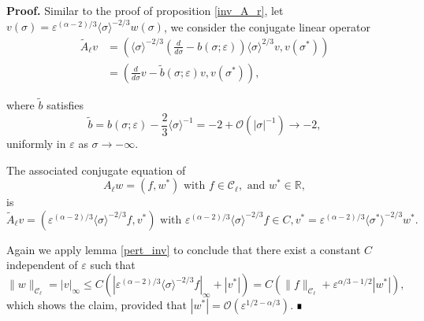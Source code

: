\documentclass[letterpaper,11pt]{article}
\newcommand{\rmO}{\mathcal{O}}
\newcommand{\eps}{\varepsilon}
\numberwithin{equation}{section}
\theoremstyle{plain}
\newenvironment{Proof}[1][.]%
 {\begin{trivlist}\item[]\textbf{Proof#1 }}%
 {\hspace*{\fill}$\rule{0.3\baselineskip}{0.35\baselineskip}$\end{trivlist}}
\begin{document}
\begin{Proof}
Similar to the proof of proposition \ref{inv_A_r}, let $v(\sigma) =\eps^{(\alpha-2)/3} \langle\sigma \rangle^{-2/3}w(\sigma)$, we consider the conjugate linear operator
\begin{align*}
\tilde{A}_\ell v &= \left( \langle \sigma\rangle^{-2/3}\left(\frac{d}{d\sigma}-b(\sigma;\eps)\right)\langle \sigma\rangle^{2/3} v, v(\sigma^*) \right) \\
&= \left( \frac{d}{d\sigma}v -\tilde{b}(\sigma;\eps)v, v(\sigma^*) \right),
\end{align*}

where $\tilde{b}$ satisfies 
\[
\tilde{b} = b(\sigma;\eps)-\frac{2}{3}\langle \sigma\rangle^{-1} =-2 + \rmO(|\sigma|^{-1}) \to -2,
\]
uniformly in $\eps$ as $\sigma \to -\infty$.

The associated conjugate equation of 
\[
A_\ell w = (f,w^*) \text{ with } f \in \mathcal{C}_\ell, \text{ and }w^* \in \mathbb{R} , 
\] is 
\[
\tilde{A}_\ell v = (\eps^{(\alpha-2)/3}\langle \sigma \rangle^{-2/3} f,v^*) \text{ with } \eps^{(\alpha-2)/3}\langle \sigma \rangle^{-2/3} f \in C, v^* = \eps^{(\alpha-2)/3}\langle \sigma^* \rangle^{-2/3} w^*.
\]

Again we apply lemma \ref{pert_inv} to conclude that there exist a constant $C$ independent of $\eps$ such that
\begin{equation}\label{linear_est:l}
\|w\|_{\mathcal{C}_\ell} = |v|_\infty \le C(|\eps^{(\alpha-2)/3}\langle \sigma \rangle^{-2/3} f |_{\infty}+| v^*|) = C(\|f\|_{\mathcal{C}_\ell}+\eps^{\alpha/3-1/2}|w^*|),
\end{equation}
which shows the claim, provided that $|w^*| = \rmO(\eps^{1/2-\alpha/3})$.
\end{Proof}
\end{document}
